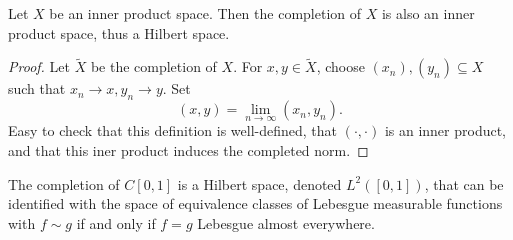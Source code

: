 \documentclass[a4paper]{article}
\begin{document}
\begin{proposition}
  Let \(X\) be an inner product space. Then the completion of \(X\) is also an inner product space, thus a Hilbert space.
\end{proposition}

\begin{proof}
  Let \(\tilde X\) be the completion of \(X\). For \(x, y \in \tilde X\), choose \((x_n), (y_n) \subseteq X\) such that \(x_n \to x, y_n \to y\). Set
  \[
    (x, y) = \lim_{n \to \infty} (x_n, y_n).
  \]
  Easy to check that this definition is well-defined, that \((\cdot, \cdot)\) is an inner product, and that this iner product induces the completed norm.
\end{proof}

\begin{eg}
  The completion of \(C[0, 1]\) is a Hilbert space, denoted \(L^2([0, 1])\), that can be identified with the space of equivalence classes of Lebesgue measurable functions with \(f \sim g\) if and only if \(f = g\) Lebesgue almost everywhere.
\end{eg}
















\printindex
\end{document}
